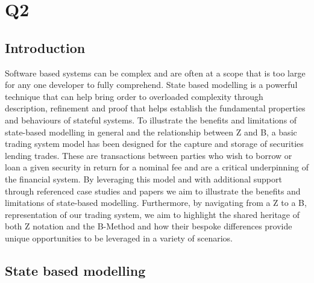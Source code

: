 \documentclass{article}
\begin{document}
\pagebreak

\section*{Q2}

\subsection*{Introduction}

Software based systems can be complex and are often at a scope that is too large for any one developer to fully comprehend. State based modelling is a powerful technique that can help bring order to overloaded complexity through description, refinement and proof that helps establish the fundamental properties and behaviours of stateful systems.
\newline \newline
To illustrate the benefits and limitations of state-based modelling in general and the relationship between Z and B, a basic trading system model has been designed for the capture and storage of securities lending trades. These are transactions between parties who wish to borrow or loan a given security in return for a nominal fee and are a critical underpinning of the financial system.
\newline \newline
By leveraging this model and with additional support through referenced case studies and papers we aim to illustrate the benefits and limitations of state-based modelling. Furthermore, by navigating from a Z to a B, representation of our trading system, we aim to highlight the shared heritage of both Z notation and the B-Method and how their bespoke differences provide unique opportunities to be leveraged in a variety of scenarios.

\subsection*{State based modelling}
\end{document}
